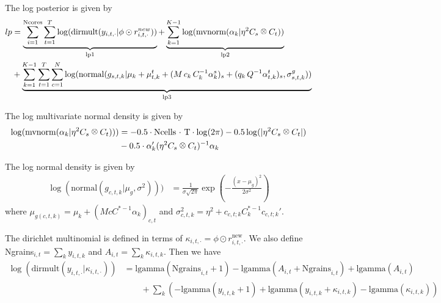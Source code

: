 \documentclass[12pt]{article}
\newcommand{\kron}{\raisebox{1pt}{\ensuremath{\:\otimes\:}}}
\newcommand{\lgamma}{\text{lgamma}}
\begin{document}
The log posterior is given by
\begin{align*}
  lp &= \underbrace{\sum_{i=1}^{\text{Ncores}} \sum_{t=1}^{T} \log(\text{dirmult}(y_{i,t,\cdot}| \phi \odot r^{new}_{i,t, \cdot}))}_{\text{lp1}} +
  \underbrace{\sum_{k=1}^{K-1}\log(\text{mvnorm}(\alpha_k| \eta^2 C_s \kron C_t))}_{\text{lp2}} \\& +
  \underbrace{\sum_{k=1}^{K-1}\sum_{t=1}^{T}\sum_{c=1}^{N}\log(\text{normal}(g_{s,t,k}| \mu_k + \mu_{t,k}^t + (M \, c_k \, C_k^{-1} \alpha^s_k)_s + (q_k \, Q^{-1} \alpha^t_{t,k})_{s} , \sigma^g_{s,t,k} ))}_{\text{lp3}}
\end{align*}

The log multivariate normal density is given by
\begin{align*}
  \log(\text{mvnorm}(\alpha_k| \eta^2 C_s \kron C_t))) &= - 0.5 \cdot \text{Ncells $\cdot$ T} \cdot
  \log(2 \pi) -0.5 \log(|\eta^2 C_s \kron C_t|) \\ \qquad & - 0.5 \cdot \alpha_k'(\eta^2 C_s \kron C_t)^{-1} \alpha_k \\
\end{align*}

The log normal density is given by
\begin{align*}
  \log(\text{normal}(g_{c,t,k}| \mu_g, \sigma^2))) &= \frac{1}{\sigma\sqrt{2\pi}} \exp\left(-\frac{(x-\mu_g)^2}{2\sigma^2}\right)
\end{align*}
where $\mu_{g (c,t,k)} = \mu_k + \left(McC^{*-1}\alpha_{k}\right)_{c,t}$ and $\sigma^2_{c,t,k}=\eta^2 + c_{c,t;k} C^{*-1}_k c_{c,t;k}'$.


The dirichlet multinomial is defined in terms of $\kappa_{i,t,\cdot} = \phi \odot r^{\text{new}}_{i,t,\cdot}$. We also define Ngrains$_{i,t}=\sum_k y_{i,t,k}$ and $A_{i,t}= \sum_k \kappa_{i,t,k}$. Then we have
\begin{align*}
  \log(\text{dirmult}(y_{i,t,\cdot}| \kappa_{i,t,\cdot}))
    &= \lgamma (\text{Ngrains}_{i,t} + 1 ) - \lgamma(A_{i,t} + \text{Ngrains}_{i,t}) + \lgamma(A_{i,t})  \\
    & \qquad + \sum_k \left( - \lgamma(y_{i,t,k} + 1) + \lgamma(y_{i,t,k} + \kappa_{i,t,k}) - \lgamma(\kappa_{i,t,k})\right)
\end{align*}
\end{document}

